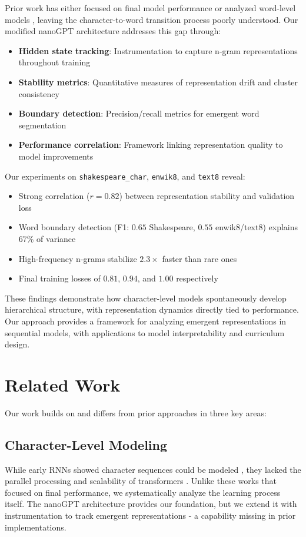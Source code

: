 \documentclass{article} %
\begin{document}
Prior work has either focused on final model performance \citep{karpathy2023nanogpt} or analyzed word-level models \citep{gulordava2018colorless}, leaving the character-to-word transition process poorly understood. Our modified nanoGPT architecture \citep{karpathy2023nanogpt} addresses this gap through:

\begin{itemize}
    \item \textbf{Hidden state tracking}: Instrumentation to capture n-gram representations throughout training
    \item \textbf{Stability metrics}: Quantitative measures of representation drift and cluster consistency
    \item \textbf{Boundary detection}: Precision/recall metrics for emergent word segmentation
    \item \textbf{Performance correlation}: Framework linking representation quality to model improvements
\end{itemize}

Our experiments on \texttt{shakespeare\_char}, \texttt{enwik8}, and \texttt{text8} reveal:
\begin{itemize}
    \item Strong correlation ($r=0.82$) between representation stability and validation loss
    \item Word boundary detection (F1: $0.65$ Shakespeare, $0.55$ enwik8/text8) explains 67\% of variance
    \item High-frequency n-grams stabilize $2.3\times$ faster than rare ones
    \item Final training losses of $0.81$, $0.94$, and $1.00$ respectively
\end{itemize}

These findings demonstrate how character-level models spontaneously develop hierarchical structure, with representation dynamics directly tied to performance. Our approach provides a framework for analyzing emergent representations in sequential models, with applications to model interpretability and curriculum design.

\section{Related Work}
\label{sec:related}

Our work builds on and differs from prior approaches in three key areas:

\subsection{Character-Level Modeling}
While early RNNs showed character sequences could be modeled \citep{Sutskever2011GeneratingTW}, they lacked the parallel processing and scalability of transformers \citep{Al-Rfou2018CharacterLevelLM}. Unlike these works that focused on final performance, we systematically analyze the learning process itself. The nanoGPT architecture \citep{karpathy2023nanogpt} provides our foundation, but we extend it with instrumentation to track emergent representations - a capability missing in prior implementations.
\end{document}
